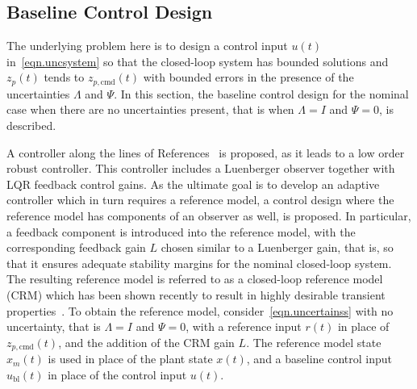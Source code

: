 \subsection{Baseline Control Design}

The underlying problem here is to design a control input $u(t)$ in\ \eqref{eqn.uncsystem} so that the closed-loop system has bounded solutions and $z_{p}(t)$ tends to  $z_{p,\text{cmd}}(t)$ with bounded errors in the presence of the uncertainties $\Lambda$ and $\Psi$.
In this section, the baseline control design for the nominal case when there are no uncertainties present, that is when $\Lambda=I$ and $\Psi=0$, is described.

A controller along the lines of References\ \cite{lavretsky.output.2010, qu.gnc.2013, wise.obltrdesign.2013} is proposed, as it leads to a low order robust controller.
This controller includes a Luenberger observer together with LQR feedback control gains.
As the ultimate goal is to develop an adaptive controller which in turn requires a reference model, a control design where the reference model has components of an observer as well, is proposed.
In particular, a feedback component is introduced into the reference model, with the corresponding feedback gain $L$ chosen similar to a Luenberger gain, that is, so that it ensures adequate stability margins for the nominal closed-loop system.
The resulting reference model is referred to as a closed-loop reference model (CRM) which has been shown recently to result in highly desirable transient properties\ \cite{gibson.aiaacrm.2012,gibson.ecc.2013,gibson.ieeeaccess.2013,gibson.acc.2013}.
To obtain the reference model, consider\ \eqref{eqn.uncertainss} with no uncertainty, that is $\Lambda=I$ and $\Psi=0$, with a reference input $r(t)$ in place of $z_{p,\text{cmd}}(t)$, and the addition of the CRM gain $L$.
The reference model state $x_{m}(t)$ is used in place of the plant state $x(t)$, and a baseline control input $u_{\text{bl}}(t)$ in place of the control input $u(t)$.

